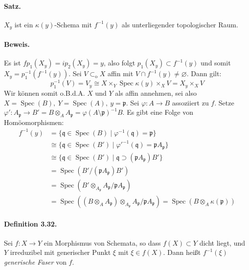 \documentclass[11pt,b5paper,openany]{memoir}
\def \qedhere {\tag*{$\square$}}
\begin{document}
\paragraph{Satz.} $X_y$ ist ein $\kappa(y)$-Schema mit $f^{-1}(y)$ als unterliegender topologischer Raum.

\paragraph{Beweis.} Es ist $fp_1(X_y)=ip_2(X_y)=y$, also folgt $p_1(X_y)\subset f^{-1}(y)$ und somit $X_y=p_1^{-1}(f^{-1}(y))$. Sei $V\subset_\text{o}X$ affin mit $V\cap f^{-1}(y)\neq\varnothing$. Dann gilt:
\[p_1^{-1}(V)=V_y\cong X\times_Y\operatorname{Spec}\kappa(y)\times_XV=X_y\times_XV \]
Wir können somit o.B.d.A. $X$ und $Y$ als affin annehmen, sei also $X=\operatorname{Spec}(B),\ Y=\operatorname{Spec}(A),\ y=\mathfrak{p}$. Sei $\varphi:A\to B$ assoziiert zu $f$. Setze $\varphi':A_\mathfrak{p}\to B'=B\otimes_AA_\mathfrak{p}=\varphi(A\setminus\mathfrak{p})^{-1}B$. Es gibt eine Folge von Homöomorphismen:
\begin{align*}
f^{-1}(y) &= \{\mathfrak{q}\in\operatorname{Spec}(B)\mid\varphi^{-1}(\mathfrak{q})=\mathfrak{p} \}\\
&\cong \{\mathfrak{q}\in\operatorname{Spec}(B')\mid\varphi'^{-1}(\mathfrak{q})=\mathfrak{p}A_\mathfrak{p} \}\\
&\cong \{ \mathfrak{q}\in\operatorname{Spec}(B')\mid\mathfrak{q}\supset (\mathfrak{p}A_\mathfrak{p})B' \} \\
&=\operatorname{Spec}(B'/(\mathfrak{p}A_\mathfrak{p})B')\\
&=\operatorname{Spec}(B'\otimes_{A_\mathfrak{p}}A_\mathfrak{p}/\mathfrak{p}A_\mathfrak{p})\\
&=\operatorname{Spec}((B\otimes_AA_\mathfrak{p})\otimes_{A_\mathfrak{p}}A_\mathfrak{p}/\mathfrak{p}A_\mathfrak{p}) =\operatorname{Spec}(B\otimes_A\kappa(\mathfrak{p}))\qedhere
\end{align*}

\paragraph{Definition 3.32.}\label{3.32} Sei $f:X\to Y$ ein Morphismus von Schemata, so dass $f(X)\subset Y$ dicht liegt, und $Y$ irreduzibel mit generischer Punkt $\xi$ mit $\xi\in f(X)$. Dann heißt $f^{-1}(\xi)$ \textit{generische Faser} von $f$.
\end{document}
